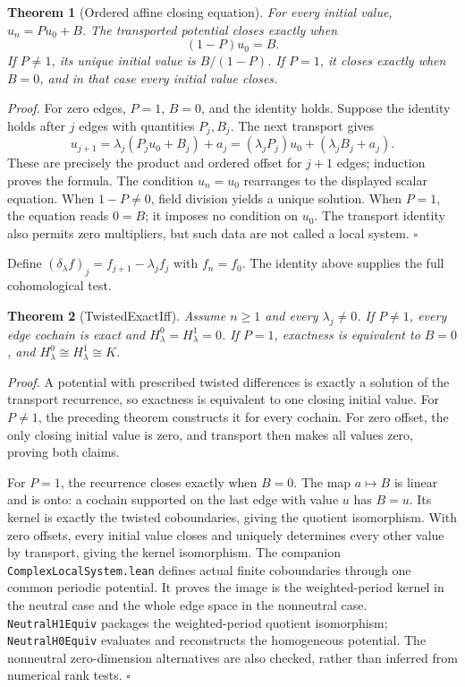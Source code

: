 \documentclass[11pt,letterpaper]{article}
\newtheorem{theorem}{Theorem}
\newenvironment{proof}{\noindent\textit{Proof.}}{\hfill\(\square\)}
\begin{document}
\begin{theorem}[Ordered affine closing equation]
For every initial value, \(u_n=Pu_0+B\). The transported potential closes exactly when
\[
(1-P)u_0=B.
\]
If \(P\ne1\), its unique initial value is \(B/(1-P)\). If \(P=1\), it closes exactly when \(B=0\), and in that case every initial value closes.
\end{theorem}
\begin{proof}
For zero edges, \(P=1\), \(B=0\), and the identity holds. Suppose the identity holds after \(j\) edges with quantities \(P_j,B_j\). The next transport gives
\[
u_{j+1}=\lambda_j(P_j u_0+B_j)+a_j
=(\lambda_jP_j)u_0+(\lambda_jB_j+a_j).
\]
These are precisely the product and ordered offset for \(j+1\) edges; induction proves the formula. The condition \(u_n=u_0\) rearranges to the displayed scalar equation. When \(1-P\ne0\), field division yields a unique solution. When \(P=1\), the equation reads \(0=B\); it imposes no condition on \(u_0\). The transport identity also permits zero multipliers, but such data are not called a local system.
\end{proof}

Define \((\delta_\lambda f)_j=f_{j+1}-\lambda_j f_j\) with \(f_n=f_0\). The identity above supplies the full cohomological test.

\begin{theorem}[TwistedExactIff]
Assume \(n\ge1\) and every \(\lambda_j\ne0\). If \(P\ne1\), every edge cochain is exact and \(H^0_\lambda=H^1_\lambda=0\). If \(P=1\), exactness is equivalent to \(B=0\), and \(H^0_\lambda\cong H^1_\lambda\cong K\).
\end{theorem}
\begin{proof}
A potential with prescribed twisted differences is exactly a solution of the transport recurrence, so exactness is equivalent to one closing initial value. For \(P\ne1\), the preceding theorem constructs it for every cochain. For zero offset, the only closing initial value is zero, and transport then makes all values zero, proving both claims.

For \(P=1\), the recurrence closes exactly when \(B=0\). The map \(a\mapsto B\) is linear and is onto: a cochain supported on the last edge with value \(u\) has \(B=u\). Its kernel is exactly the twisted coboundaries, giving the quotient isomorphism. With zero offsets, every initial value closes and uniquely determines every other value by transport, giving the kernel isomorphism. The companion \texttt{Complex\allowbreak Local\allowbreak System.\allowbreak lean} defines actual finite coboundaries through one common periodic potential. It proves the image is the weighted-period kernel in the neutral case and the whole edge space in the nonneutral case. \texttt{Neutral\allowbreak H1\allowbreak Equiv} packages the weighted-period quotient isomorphism; \texttt{Neutral\allowbreak H0\allowbreak Equiv} evaluates and reconstructs the homogeneous potential. The nonneutral zero-dimension alternatives are also checked, rather than inferred from numerical rank tests.
\end{proof}
\end{document}
